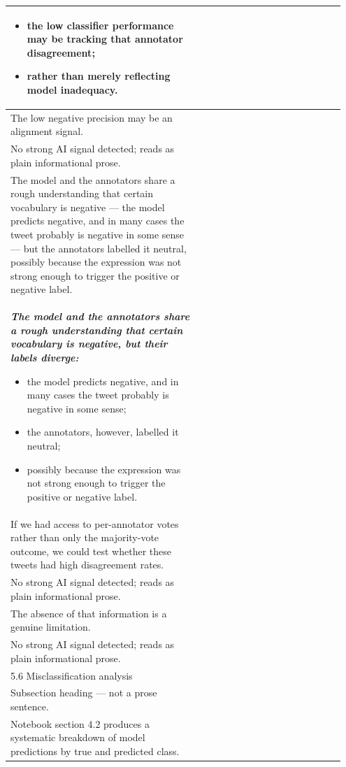 \documentclass[11pt]{article}
\begin{document}
\begin{longtable}{|p{0.55\linewidth}|p{0.40\linewidth}|}
{\begin{itemize}[leftmargin=*,topsep=2pt,itemsep=1pt,parsep=0pt]
  \item the low classifier performance may be tracking that annotator disagreement;
  \item rather than merely reflecting model inadequacy.
\end{itemize}}\vspace{2em} & \\
\hline
The low negative precision may be an alignment signal. & \\[2pt]
\hline
No strong AI signal detected; reads as plain informational prose. & \\
\hline
The model and the annotators share a rough understanding that certain vocabulary is negative --- the model predicts negative, and in many cases the tweet probably is negative in some sense --- but the annotators labelled it neutral, possibly because the expression was not strong enough to trigger the positive or negative label. & \\[2pt]
\hline
{\bfseries\itshape The model and the annotators share a rough understanding that certain vocabulary is negative, but their labels diverge:
\begin{itemize}[leftmargin=*,topsep=2pt,itemsep=1pt,parsep=0pt]
  \item the model predicts negative, and in many cases the tweet probably is negative in some sense;
  \item the annotators, however, labelled it neutral;
  \item possibly because the expression was not strong enough to trigger the positive or negative label.
\end{itemize}}\vspace{2em} & \\
\hline
If we had access to per-annotator votes rather than only the majority-vote outcome, we could test whether these tweets had high disagreement rates. & \\[2pt]
\hline
No strong AI signal detected; reads as plain informational prose. & \\
\hline
The absence of that information is a genuine limitation. & \\[2pt]
\hline
No strong AI signal detected; reads as plain informational prose. & \\
\hline
5.6 Misclassification analysis & \\[2pt]
\hline
Subsection heading --- not a prose sentence. & \\
\hline
Notebook section 4.2 produces a systematic breakdown of model predictions by true and predicted class. & \\[2pt]

\end{longtable}
\end{document}
